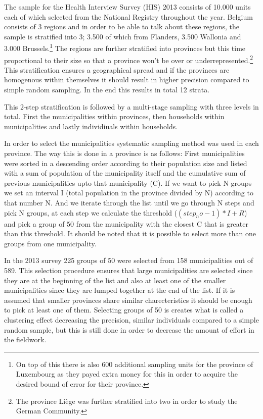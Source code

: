 The sample for the Health Interview Survey (HIS) 2013 consists of 10.000 units each of which selected from the National Registry throughout the year. Belgium consists of 3 regions and in order to be able to talk about these regions, the sample is stratified into 3; 3.500 of which from Flanders, 3.500 Wallonia and 3.000 Brussels.\footnote{On top of this there is also 600 additional sampling units for the province of Luxembourg as they payed extra money for this in order to acquire the desired bound of error for their province.} The regions are further stratified into provinces but this time proportional to their size so that a province won't be over or underrepresented.\footnote{The province Liège was further stratified into two in order to study the German Community.} This stratification ensures a geographical spread and if the provinces are homogenous within themselves it should result in higher precision compared to simple random sampling. In the end this results in total 12 strata.

This 2-step stratification is followed by a multi-stage sampling with three levels in total. First the municipalities within provinces, then households within municipalities and lastly individiuals within households. 

In order to select the municipalities systematic sampling method was used in each province. The way this is done in a province is as follows: First municipalities were sorted in a descending order according to their population size and listed with a sum of population of the municipality itself and the cumulative sum of previous municipalities upto that municipality (C). If we want to pick N groups we set an interval I (total population in the province divided by N) according to that number N. And we iterate through the list until we go through N steps and pick N groups, at each step we calculate the threshold ($(step_no-1)*I + R$) and pick a group of 50 from the municipality with the closest C that is greater than this threshold. It should be noted that it is possible to select more than one groups from one municipality.

In the 2013 survey 225 groups of 50 were selected from 158 municipalities out of 589. This selection procedure ensures that large municipalities are selected since they are at the beginning of the list and also at least one of the smaller municipalities since they are lumped together at the end of the list. If it is assumed that smaller provinces share similar charecteristics it should be enough to pick at least one of them. Selecting groups of 50 is creates what is called a clustering effect decreasing the precision, similar individuals compared to a simple random sample, but this is still done in order to decrease the amount of effort in the fieldwork.

